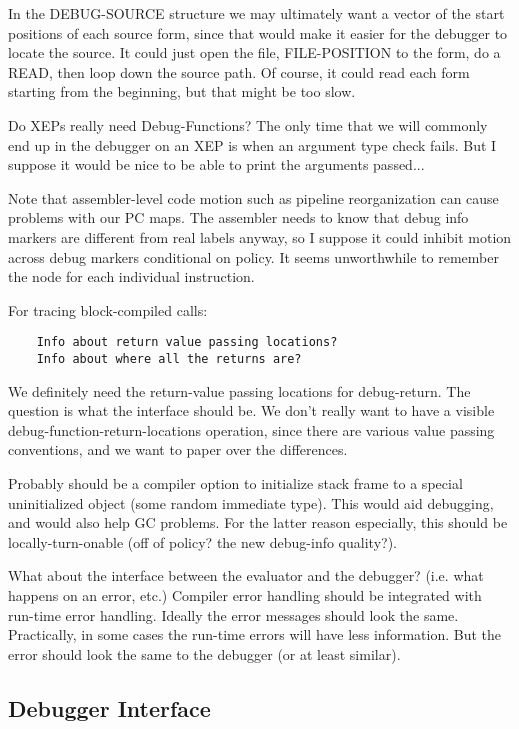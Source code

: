 In the DEBUG-SOURCE structure we may ultimately want a vector of the start
positions of each source form, since that would make it easier for the debugger
to locate the source.  It could just open the file, FILE-POSITION to the form,
do a READ, then loop down the source path.  Of course, it could read each form
starting from the beginning, but that might be too slow.


Do XEPs really need Debug-Functions?  The only time that we will commonly end
up in the debugger on an XEP is when an argument type check fails.  But I
suppose it would be nice to be able to print the arguments passed...


Note that assembler-level code motion such as pipeline reorganization can cause
problems with our PC maps.  The assembler needs to know that debug info markers
are different from real labels anyway, so I suppose it could inhibit motion
across debug markers conditional on policy.  It seems unworthwhile to remember
the node for each individual instruction.


For tracing block-compiled calls:
\begin{verbatim}
    Info about return value passing locations?
    Info about where all the returns are?
\end{verbatim}

We definitely need the return-value passing locations for debug-return.  The
question is what the interface should be.  We don't really want to have a
visible debug-function-return-locations operation, since there are various
value passing conventions, and we want to paper over the differences.


Probably should be a compiler option to initialize stack frame to a special
uninitialized object (some random immediate type).  This would aid debugging,
and would also help GC problems.  For the latter reason especially, this should
be locally-turn-onable (off of policy?  the new debug-info quality?).


What about the interface between the evaluator and the debugger? (i.e. what
happens on an error, etc.)  Compiler error handling should be integrated with
run-time error handling.  Ideally the error messages should look the same.
Practically, in some cases the run-time errors will have less information.  But
the error should look the same to the debugger (or at least similar).



\subsection{Debugger Interface}

